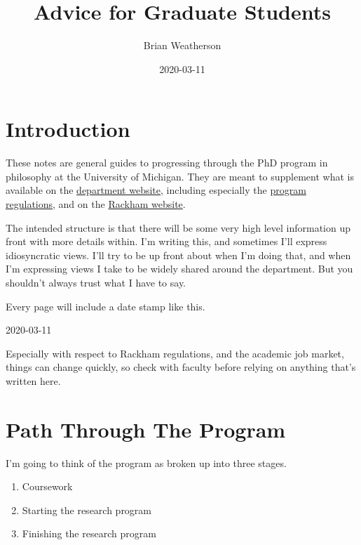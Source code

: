\documentclass[]{book}
\title{Advice for Graduate Students}
\author{Brian Weatherson}
\date{2020-03-11}
\providecommand{\tightlist}{%
  \setlength{\itemsep}{0pt}\setlength{\parskip}{0pt}}
\begin{document}
\maketitle

{
\setcounter{tocdepth}{1}
\tableofcontents
}
\hypertarget{introduction}{%
\chapter{Introduction}\label{introduction}}

These notes are general guides to progressing through the PhD program in philosophy at the University of Michigan. They are meant to supplement what is available on the \href{https://lsa.umich.edu/philosophy/graduates.html}{department website}, including especially the \href{https://lsa.umich.edu/philosophy/graduates/current-students/phd-regulations.html}{program regulations}, and on the \href{https://rackham.umich.edu}{Rackham website}.

The intended structure is that there will be some very high level information up front with more details within. I'm writing this, and sometimes I'll express idiosyncratic views. I'll try to be up front about when I'm doing that, and when I'm expressing views I take to be widely shared around the department. But you shouldn't always trust what I have to say.

Every page will include a date stamp like this.

\begin{description}
\tightlist
\item[Last Modified]
2020-03-11
\end{description}

Especially with respect to Rackham regulations, and the academic job market, things can change quickly, so check with faculty before relying on anything that's written here.

\hypertarget{path-through-the-program}{%
\chapter{Path Through The Program}\label{path-through-the-program}}

I'm going to think of the program as broken up into three stages.

\begin{enumerate}
\def\labelenumi{\arabic{enumi}.}
\tightlist
\item
  Coursework
\item
  Starting the research program
\item
  Finishing the research program
\end{enumerate}
\end{document}
